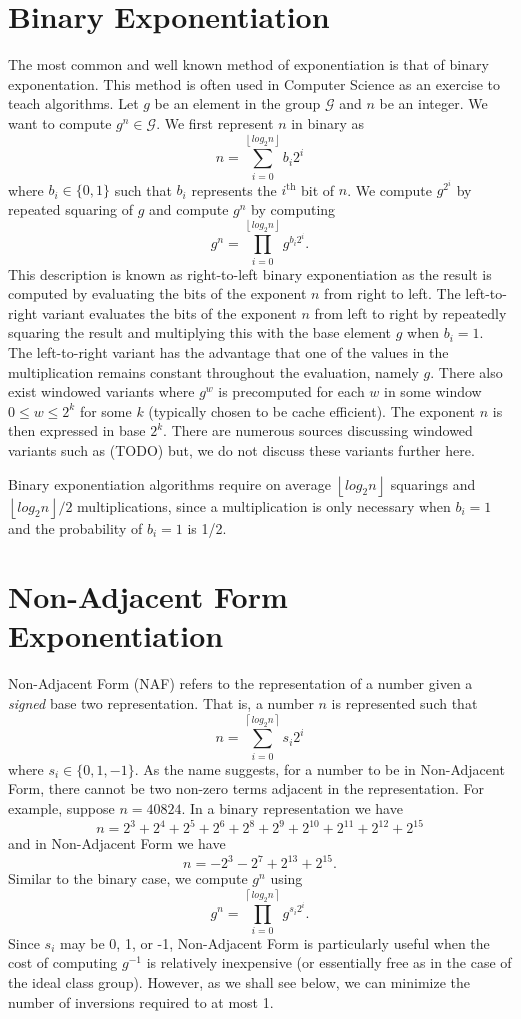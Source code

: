 \documentclass{ucalgthes1}
\theoremstyle{plain}
\theoremstyle{definition}
\newcommand{\floor}[1]{\left\lfloor #1 \right\rfloor}
\newcommand{\ceil}[1]{\left\lceil #1 \right\rceil}
\begin{document}
\section{Binary Exponentiation}\label{section:binary}
The most common and well known method of exponentiation is that of binary exponentation.  This method is often used in Computer Science as an exercise to teach algorithms.  Let $g$ be an element in the group $\mathcal G$ and $n$ be an integer.  We want to compute $g^n \in \mathcal G$.  We first represent $n$ in binary as
\[
	n = \sum_{i=0}^{\floor{log_2 n}} b_i 2^i
\]
where $b_i \in \{0, 1\}$ such that $b_i$ represents the $i^{\textrm{th}}$ bit of $n$.   We compute $g^{2^i}$ by repeated squaring of $g$ and compute $g^n$ by computing
\[
	g^n = \prod_{i=0}^{\floor{log_2 n}} g^{b_i 2^i}.
\]
This description is known as right-to-left binary exponentiation as the result is computed by evaluating the bits of the exponent $n$ from right to left.  The left-to-right variant evaluates the bits of the exponent $n$ from left to right by repeatedly squaring the result and multiplying this with the base element $g$ when $b_i = 1$.  The left-to-right variant has the advantage that one of the values in the multiplication remains constant throughout the evaluation, namely $g$.  There also exist windowed variants where $g^w$ is precomputed for each $w$ in some window $0 \le w \le 2^k$ for some $k$ (typically chosen to be cache efficient). The exponent $n$ is then expressed in base $2^k$.  There are numerous sources discussing windowed variants such as (TODO) but, we do not discuss these variants further here.

Binary exponentiation algorithms require on average $\floor{log_2 n}$ squarings and $\floor{log_2 n}/2$ multiplications, since a multiplication is only necessary when $b_i = 1$ and the probability of $b_i = 1$ is 1/2.

\bigbreak
\section{Non-Adjacent Form Exponentiation}\label{section:naf}

Non-Adjacent Form (NAF) refers to the representation of a number given a \emph{signed} base two representation.  That is, a number $n$ is represented such that
\[
	n = \sum_{i=0}^{\ceil{log_2 n}} s_i 2^i
\]
where $s_i \in \{0, 1, -1\}$.  As the name suggests, for a number to be in Non-Adjacent Form, there cannot be two non-zero terms adjacent in the representation.  For example, suppose $n = 40824$.  In a binary representation we have
\[
	n = 2^3+2^4+2^5+2^6+2^8+2^9+2^{10}+2^{11}+2^{12}+2^{15}
\]
and in Non-Adjacent Form we have
\[
	n = -2^3-2^7+2^{13}+2^{15}.
\]
Similar to the binary case, we compute $g^n$ using
\[
	g^n = \prod _{i=0}^{\ceil{log_2 n}} g^{s_i 2^i}.
\]
Since $s_i$ may be 0, 1, or -1, Non-Adjacent Form is particularly useful when the cost of computing $g^{-1}$ is relatively inexpensive (or essentially free as in the case of the ideal class group).  However, as we shall see below, we can minimize the number of inversions required to at most 1.
\end{document}

